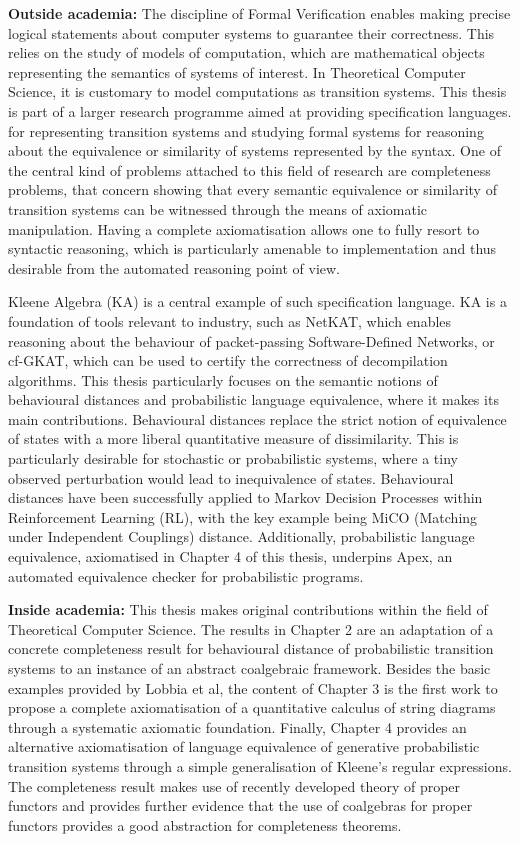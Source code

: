 \begin{impactstatement}
\textbf{Outside academia:} The discipline of Formal Verification enables making precise logical statements about computer systems to guarantee their correctness. This relies on the study of models of computation, which are mathematical objects representing the semantics of systems of interest. In Theoretical Computer Science, it is customary to model computations as transition systems. This thesis is part of a larger research programme aimed at providing specification languages. for representing transition systems and studying formal systems for reasoning about the equivalence or similarity of systems represented by the syntax. One of the central kind of problems attached to this field of research are completeness problems, that concern showing that every semantic equivalence or similarity of transition systems can be witnessed through the means of axiomatic manipulation. Having a complete axiomatisation allows one to fully resort to syntactic reasoning, which is particularly amenable to implementation and thus desirable from the automated reasoning point of view. 

Kleene Algebra (KA) is a central example of such specification language. KA is a foundation of tools relevant to industry, such as NetKAT, which enables reasoning about the behaviour of packet-passing Software-Defined Networks, or cf-GKAT, which can be used to certify the correctness of decompilation algorithms. This thesis particularly focuses on the semantic notions of behavioural distances and probabilistic language equivalence, where it makes its main contributions. Behavioural distances replace the strict notion of equivalence of states with a more liberal quantitative measure of dissimilarity. This is particularly desirable for stochastic or probabilistic systems, where a tiny observed perturbation would lead to inequivalence of states. Behavioural distances have been successfully applied to Markov Decision Processes within Reinforcement Learning (RL), with the key example being MiCO (Matching under Independent Couplings) distance. Additionally, probabilistic language equivalence, axiomatised in Chapter 4 of this thesis, underpins Apex, an automated equivalence checker for probabilistic programs.

\textbf{Inside academia:} This thesis makes original contributions within the field of Theoretical Computer Science. The results in Chapter 2 are an adaptation of a concrete completeness result for behavioural distance of probabilistic transition systems to an instance of an abstract coalgebraic framework. Besides the basic examples provided by Lobbia et al, the content of Chapter 3 is the first work to propose a complete axiomatisation of a quantitative calculus of string diagrams through a systematic axiomatic foundation. Finally, Chapter 4 provides an alternative axiomatisation of language equivalence of generative probabilistic transition systems through a simple generalisation of Kleene’s regular expressions. The completeness result makes use of recently developed theory of proper functors and provides further evidence that the use of coalgebras for proper functors provides a good abstraction for completeness theorems.


\end{impactstatement}
